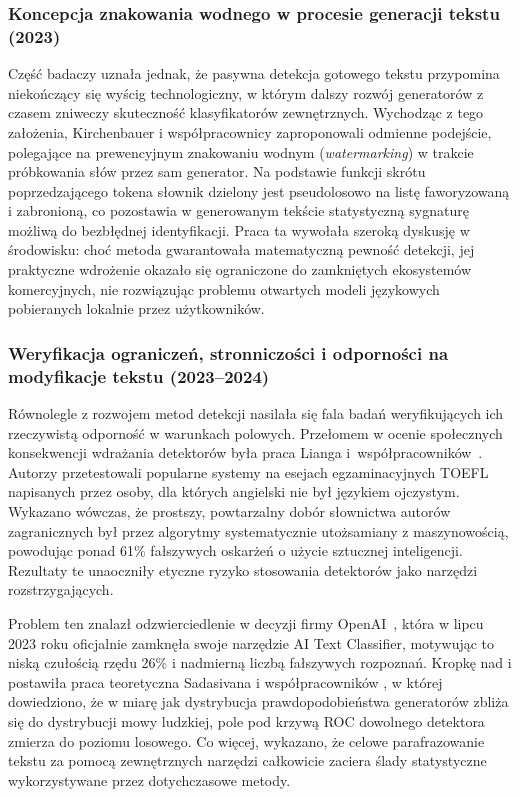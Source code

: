 \subsubsection{Koncepcja znakowania wodnego w procesie generacji tekstu (2023)}

Część badaczy uznała jednak, że pasywna detekcja gotowego tekstu przypomina niekończący się wyścig technologiczny, w którym dalszy rozwój generatorów z czasem zniweczy skuteczność klasyfikatorów zewnętrznych. Wychodząc z tego założenia, Kirchenbauer i współpracownicy \cite{kirchenbauer2023watermark} zaproponowali odmienne podejście, polegające na prewencyjnym znakowaniu wodnym (\textit{watermarking}) w trakcie próbkowania słów przez sam generator. Na podstawie funkcji skrótu poprzedzającego tokena słownik dzielony jest pseudolosowo na listę faworyzowaną i zabronioną, co pozostawia w generowanym tekście statystyczną sygnaturę możliwą do bezbłędnej identyfikacji. Praca ta wywołała szeroką dyskusję w środowisku: choć metoda gwarantowała matematyczną pewność detekcji, jej praktyczne wdrożenie okazało się ograniczone do zamkniętych ekosystemów komercyjnych, nie rozwiązując problemu otwartych modeli językowych pobieranych lokalnie przez użytkowników.

\subsubsection{Weryfikacja ograniczeń, stronniczości i odporności na modyfikacje tekstu (2023--2024)}

Równolegle z rozwojem metod detekcji nasilała się fala badań weryfikujących ich rzeczywistą odporność w warunkach polowych. Przełomem w ocenie społecznych konsekwencji wdrażania detektorów była praca Lianga i~współpracowników~\cite{liang2023gptdetectors}. Autorzy przetestowali popularne systemy na esejach egzaminacyjnych TOEFL napisanych przez osoby, dla których angielski nie był językiem ojczystym. Wykazano wówczas, że prostszy, powtarzalny dobór słownictwa autorów zagranicznych był przez algorytmy systematycznie utożsamiany z maszynowością, powodując ponad 61\% fałszywych oskarżeń o użycie sztucznej inteligencji. Rezultaty te unaoczniły etyczne ryzyko stosowania detektorów jako narzędzi rozstrzygających.

Problem ten znalazł odzwierciedlenie w decyzji firmy OpenAI~\cite{openai2023classifier}, która w lipcu 2023 roku oficjalnie zamknęła swoje narzędzie AI Text Classifier, motywując to niską czułością rzędu 26\% i nadmierną liczbą fałszywych rozpoznań. Kropkę nad i postawiła praca teoretyczna Sadasivana i współpracowników \cite{sadasivan2023can}, w której dowiedziono, że w miarę jak dystrybucja prawdopodobieństwa generatorów zbliża się do dystrybucji mowy ludzkiej, pole pod krzywą ROC dowolnego detektora zmierza do poziomu losowego. Co więcej, wykazano, że celowe parafrazowanie tekstu za pomocą zewnętrznych narzędzi całkowicie zaciera ślady statystyczne wykorzystywane przez dotychczasowe metody.

